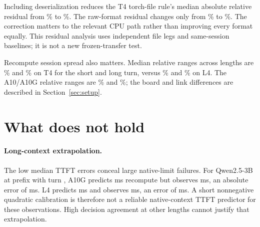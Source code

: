 \documentclass[10pt]{article}
\begin{document}
Including deserialization reduces the T4 torch-file rule's median absolute relative residual from \% to \%. The raw-format residual changes only from \% to \%. The correction matters to the relevant CPU path rather than improving every format equally. This residual analysis uses independent file legs and same-session baselines; it is not a new frozen-transfer test.

Recompute session spread also matters. Median relative ranges across lengths are \% and \% on T4 for the short and long turn, versus \% and \% on L4. The A10/A10G relative ranges are \% and \%; the board and link differences are described in Section~\ref{sec:setup}.

\section{What does not hold}\label{sec:negative}
\paragraph{Long-context extrapolation.}
The low median TTFT errors conceal large native-limit failures. For Qwen2.5-3B at prefix  with turn , A10G predicts  ms recompute but observes  ms, an absolute error of  ms. L4 predicts  ms and observes  ms, an error of  ms. A short nonnegative quadratic calibration is therefore not a reliable native-context TTFT predictor for these observations. High decision agreement at other lengths cannot justify that extrapolation.
\end{document}

